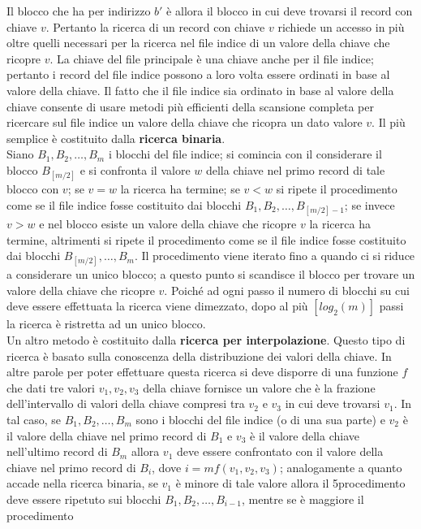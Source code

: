 Il blocco che ha per indirizzo $b'$ è allora il blocco in cui deve trovarsi il record con chiave $v$.
Pertanto la ricerca di un record con chiave $v$ richiede un accesso in più oltre quelli necessari per la
ricerca nel file indice di un valore della chiave che ricopre $v$.
La chiave del file principale è una chiave anche per il file indice; pertanto i record del file indice
possono a loro volta essere ordinati in base al valore della chiave. Il fatto che il file indice sia
ordinato in base al valore della chiave consente di usare metodi più efficienti della scansione
completa per ricercare sul file indice un valore della chiave che ricopra un dato valore $v$.
Il più semplice è costituito dalla \textbf{ricerca binaria}.\\ Siano $B_1, B_2, \ldots, B_m$ i blocchi del file indice; si
comincia con il considerare il blocco $B_{[m/2]}$ e si confronta il valore $w$ della chiave nel primo record
di tale blocco con $v$; se $v = w$ la ricerca ha termine; se $v < w$ si ripete il procedimento come se il file
indice fosse costituito dai blocchi $B_1, B_2, \ldots, B_{[m/2]-1}$; se invece $v > w$ e nel blocco esiste un valore
della chiave che ricopre $v$ la ricerca ha termine, altrimenti si ripete il procedimento come se il file
indice fosse costituito dai blocchi $B_{[m/2]}, \ldots, B_m$. Il procedimento viene iterato fino a quando
ci si riduce a considerare un unico blocco; a questo punto si scandisce il blocco per trovare un
valore della chiave che ricopre $v$. Poiché ad ogni passo il numero di blocchi su cui deve essere
effettuata la ricerca viene dimezzato, dopo al più $[log_2(m)]$ passi la ricerca è ristretta ad un unico
blocco.\\
Un altro metodo è costituito dalla \textbf{ricerca per interpolazione}. Questo tipo di ricerca è basato sulla
conoscenza della distribuzione dei valori della chiave. In altre parole per poter effettuare questa
ricerca si deve disporre di una funzione $f$ che dati tre valori $v_1, v_2, v_3$ della chiave fornisce un valore
che è la frazione dell'intervallo di valori della chiave compresi tra $v_2$ e $v_3$ in cui deve trovarsi $v_1$. 
In tal caso, se $B_1, B_2, \ldots, B_m$ sono i blocchi del file indice (o di una sua parte) e $v_2$ è il valore della
chiave nel primo record di $B_1$ e $v_3$ è il valore della chiave nell'ultimo record di $B_m$ allora $v_1$ deve
essere confrontato con il valore della chiave nel primo record di $B_i$, dove $i = mf(v_1, v_2, v_3)$;
analogamente a quanto accade nella ricerca binaria, se $v_1$ è minore di tale valore allora il
5procedimento deve essere ripetuto sui blocchi $B_1, B_2, \ldots, B_{i-1}$, mentre se è maggiore il procedimento
